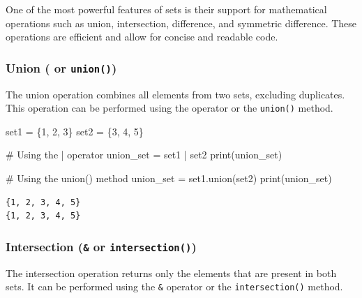 \documentclass[
  letterpaper,
  DIV=11,
  numbers=noendperiod]{scrreprt}
\newenvironment{Shaded}{\begin{snugshade}}{\end{snugshade}}
\newcommand{\BuiltInTok}[1]{\textcolor[rgb]{0.00,0.23,0.31}{#1}}
\newcommand{\CommentTok}[1]{\textcolor[rgb]{0.37,0.37,0.37}{#1}}
\newcommand{\DecValTok}[1]{\textcolor[rgb]{0.68,0.00,0.00}{#1}}
\newcommand{\NormalTok}[1]{\textcolor[rgb]{0.00,0.23,0.31}{#1}}
\newcommand{\OperatorTok}[1]{\textcolor[rgb]{0.37,0.37,0.37}{#1}}
\begin{document}
One of the most powerful features of sets is their support for
mathematical operations such as union, intersection, difference, and
symmetric difference. These operations are efficient and allow for
concise and readable code.

\hypertarget{union-or-union}{%
\subsubsection{\texorpdfstring{Union (\texttt{\textbar{}} or
\texttt{union()})}{Union (\textbar{} or union())}}\label{union-or-union}}

The union operation combines all elements from two sets, excluding
duplicates. This operation can be performed using the
\texttt{\textbar{}} operator or the \texttt{union()} method.

\begin{Shaded}
\begin{Highlighting}[]
\NormalTok{set1 }\OperatorTok{=}\NormalTok{ \{}\DecValTok{1}\NormalTok{, }\DecValTok{2}\NormalTok{, }\DecValTok{3}\NormalTok{\}}
\NormalTok{set2 }\OperatorTok{=}\NormalTok{ \{}\DecValTok{3}\NormalTok{, }\DecValTok{4}\NormalTok{, }\DecValTok{5}\NormalTok{\}}

\CommentTok{\# Using the | operator}
\NormalTok{union\_set }\OperatorTok{=}\NormalTok{ set1 }\OperatorTok{|}\NormalTok{ set2}
\BuiltInTok{print}\NormalTok{(union\_set)  }

\CommentTok{\# Using the union() method}
\NormalTok{union\_set }\OperatorTok{=}\NormalTok{ set1.union(set2)}
\BuiltInTok{print}\NormalTok{(union\_set)  }
\end{Highlighting}
\end{Shaded}

\begin{verbatim}
{1, 2, 3, 4, 5}
{1, 2, 3, 4, 5}
\end{verbatim}

\hypertarget{intersection-or-intersection}{%
\subsubsection{\texorpdfstring{Intersection (\texttt{\&} or
\texttt{intersection()})}{Intersection (\& or intersection())}}\label{intersection-or-intersection}}

The intersection operation returns only the elements that are present in
both sets. It can be performed using the \texttt{\&} operator or the
\texttt{intersection()} method.
\end{document}
